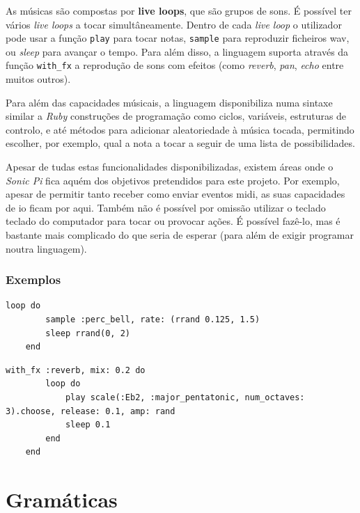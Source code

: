 \documentclass[
  oneside,
  11pt, a4paper,
  footinclude=true,
  headinclude=true,
  cleardoublepage=empty
]{scrbook}
\begin{document}
	As músicas são compostas por \textbf{live loops}, que são grupos de sons. É possível ter vários \textit{live loops} a tocar simultâneamente. Dentro de cada \textit{live loop} o utilizador pode usar a função \texttt{play} para tocar notas, \texttt{sample} para reproduzir ficheiros \acrshort{wav}, ou \textit{sleep} para avançar o tempo. Para além disso, a linguagem suporta através da função \texttt{with\_fx} a reprodução de sons com efeitos (como \textit{reverb}, \textit{pan}, \textit{echo} entre muitos outros\cite{sonic-pi-fx}).
	
	Para além das capacidades músicais, a linguagem disponibiliza numa sintaxe similar a \textit{Ruby} construções de programação como ciclos, variáveis, estruturas de controlo, e até métodos para adicionar aleatoriedade à música tocada, permitindo escolher, por exemplo, qual a nota a tocar a seguir de uma lista de possibilidades.
	
	Apesar de tudas estas funcionalidades disponibilizadas, existem áreas onde o \textit{Sonic Pi} fica aquém dos objetivos pretendidos para este projeto. Por exemplo, apesar de permitir tanto receber como enviar eventos \acrshort{midi}, as suas capacidades de \acrfull{io} ficam por aqui. Também não é possível por omissão utilizar o teclado teclado do computador para tocar ou provocar ações. É possível fazê-lo, mas é bastante mais complicado do que seria de esperar (para além de exigir programar noutra linguagem).
	
	\subsubsection{Exemplos}
	\begin{lstlisting}[caption={Reproduzir um \textit{sample} com valores aleatórios}] 
    loop do
        sample :perc_bell, rate: (rrand 0.125, 1.5)
        sleep rrand(0, 2)
    end
    \end{lstlisting}
    
    \begin{lstlisting}[caption={Reproduzir um notas de uma escala aleatórias, com efeito \textit{reverb}}] 
    with_fx :reverb, mix: 0.2 do
        loop do
            play scale(:Eb2, :major_pentatonic, num_octaves: 3).choose, release: 0.1, amp: rand
            sleep 0.1
        end
    end
    \end{lstlisting}
    
    
	\section{Gramáticas}
\end{document}

